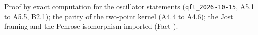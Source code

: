 Proof by exact computation for the oscillator statements (\texttt{qft\_2026-10-15}, A5.1 to A5.5, B2.1); the parity of the two-point kernel (A4.4 to A4.6); the Jost framing and the Penrose isomorphism imported (Fact ).
